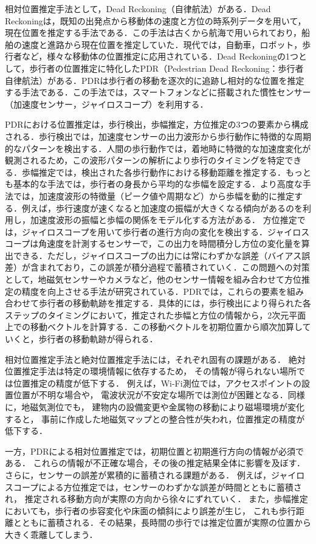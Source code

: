 相対位置推定手法として，Dead Reckoning（自律航法）がある．Dead Reckoningは，既知の出発点から移動体の速度と方位の時系列データを用いて，現在位置を推定する手法である．この手法は古くから航海で用いられており，船舶の速度と進路から現在位置を推定していた．現代では，自動車，ロボット，歩行者など，様々な移動体の位置推定に応用されている．Dead Reckoningの1つとして，歩行者の位置推定に特化したPDR（Pedestrian Dead Reckoning：歩行者自律航法）がある．PDRは歩行者の移動を逐次的に追跡し相対的な位置を推定する手法である．この手法では，スマートフォンなどに搭載された慣性センサー（加速度センサー，ジャイロスコープ）を利用する．

PDRにおける位置推定は，歩行検出，歩幅推定，方位推定の3つの要素から構成される．歩行検出では，加速度センサーの出力波形から歩行動作に特徴的な周期的なパターンを検出する．人間の歩行動作では，着地時に特徴的な加速度変化が観測されるため，この波形パターンの解析により歩行のタイミングを特定できる．歩幅推定では，検出された各歩行動作における移動距離を推定する．もっとも基本的な手法では，歩行者の身長から平均的な歩幅を設定する．より高度な手法では，加速度波形の特徴量（ピーク値や周期など）から歩幅を動的に推定する．例えば，歩行速度が速くなると加速度の振幅が大きくなる傾向があるのを利用し，加速度波形の振幅と歩幅の関係をモデル化する方法がある．
方位推定では，ジャイロスコープを用いて歩行者の進行方向の変化を検出する．ジャイロスコープは角速度を計測するセンサーで，この出力を時間積分し方位の変化量を算出できる．ただし，ジャイロスコープの出力には常にわずかな誤差（バイアス誤差）が含まれており，この誤差が積分過程で蓄積されていく．この問題への対策として，地磁気センサーやカメラなど，他のセンサー情報を組み合わせて方位推定の精度を向上させる手法が研究されている．PDRでは，これらの要素を組み合わせて歩行者の移動軌跡を推定する．具体的には，歩行検出により得られた各ステップのタイミングにおいて，推定された歩幅と方位の情報から，2次元平面上での移動ベクトルを計算する．この移動ベクトルを初期位置から順次加算していくと，歩行者の移動軌跡が得られる．

相対位置推定手法と絶対位置推定手法には，それぞれ固有の課題がある．
絶対位置推定手法は特定の環境情報に依存するため，
その情報が得られない場所では位置推定の精度が低下する．
例えば，Wi-Fi測位では，アクセスポイントの設置位置が不明な場合や，
電波状況が不安定な場所では測位が困難となる．同様に，地磁気測位でも，
建物内の設備変更や金属物の移動により磁場環境が変化すると，
事前に作成した地磁気マップとの整合性が失われ，位置推定の精度が低下する．

一方，PDRによる相対位置推定では，初期位置と初期進行方向の情報が必須である．
これらの情報が不正確な場合，その後の推定結果全体に影響を及ぼす．
さらに，センサーの誤差が累積的に蓄積される課題がある．
例えば，ジャイロスコープによる方位推定では，センサーのわずかな誤差が時間とともに蓄積され，
推定される移動方向が実際の方向から徐々にずれていく．
また，歩幅推定においても，歩行者の歩容変化や床面の傾斜により誤差が生じ，
これも歩行距離とともに蓄積される．その結果，長時間の歩行では推定位置が実際の位置から大きく乖離してしまう．

